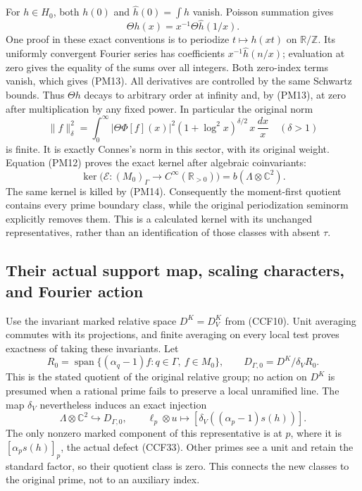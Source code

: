 For $h\in H_0$, both $h(0)$ and $\widehat h(0)=\int h$ vanish.
Poisson summation gives
\[
 \Theta h(x)=x^{-1}\Theta\widehat h(1/x).
 \tag{PM13}
\]
One proof in these exact conventions is to periodize
$t\mapsto h(xt)$ on $\mathbb R/\mathbb Z$. Its uniformly
convergent Fourier series has coefficients
$x^{-1}\widehat h(n/x)$; evaluation at zero gives the equality
of the sums over all integers. Both zero-index terms vanish,
which gives (PM13). All derivatives are controlled by the
same Schwartz bounds. Thus $\Theta h$ decays to arbitrary
order at infinity and, by (PM13), at zero after multiplication
by any fixed power. In particular the original norm
\[
 \|f\|_\delta^2=
   \int_0^\infty |\Theta\Phi[f](x)|^2
          (1+\log^2x)^{\delta/2}\,x\,\frac{dx}{x}
 \quad(\delta>1)
 \tag{PM14}
\]
is finite. It is exactly Connes's norm in this sector, with
its original weight. Equation (PM12) proves the exact kernel
after algebraic coinvariants:
\[
 \ker\bigl(\mathcal E:(M_0)_\Gamma\to
               C^\infty(\mathbb R_{>0})\bigr)
       =b(\Lambda\otimes\mathbb C^2).
 \tag{PM15}
\]
The same kernel is killed by (PM14). Consequently the
moment-first quotient contains every prime boundary class,
while the original periodization seminorm explicitly removes
them. This is a calculated kernel with its unchanged
representatives, rather than an identification of those classes
with absent $\tau$.

\subsection{Their actual support map, scaling characters, and Fourier action}

Use the invariant marked relative space $D^K=D_V^K$ from
(CCF10). Unit averaging commutes with its projections, and
finite averaging on every local test proves exactness of
taking these invariants. Let
\[
 R_0=\operatorname{span}\{(\alpha_q-1)f:
            q\in\Gamma,\ f\in M_0\},\qquad
 D_{\Gamma,0}=D^K/\delta_VR_0.
 \tag{PM16}
\]
This is the stated quotient of the original relative group;
no action on $D^K$ is presumed when a rational prime fails
to preserve a local unramified line. The map $\delta_V$
nevertheless induces an exact injection
\[
 \Lambda\otimes\mathbb C^2\hookrightarrow D_{\Gamma,0},
 \qquad \ell_p\otimes u\longmapsto
             [\delta_V((\alpha_p-1)s(h))].
 \tag{PM17}
\]
The only nonzero marked component of this representative is
at $p$, where it is $[\alpha_ps(h)]_p$, the actual defect
(CCF33). Other primes see a unit and retain the standard
factor, so their quotient class is zero. This connects the
new classes to the original prime, not to an auxiliary index.

